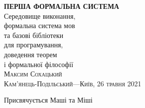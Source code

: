 \frontmatter
\thispagestyle{empty}
\mbox{}\vspace{1in}
\noindent
\begin{flushright}
\vspace{0.5cm}
\textbf{\Huge ПЕРША ФОРМАЛЬНА СИСТЕМА} \\
\vspace{0.5cm}
{\huge Середовище виконання, \\
        \huge формальна система мов \\
        \huge та базові бібліотеки \\
        \huge для програмування, \\
        \huge доведення теорем \\
        \huge і формальної філософії \\
}
\vspace{1em}
\vspace{6cm}
\hfill{\Large\scshape{}Максим Сохацький}
\\
\vspace{0.3cm}
\hfill{\scshape{}Кам'янець-Подільський---Київ, 26 травня 2021}
\end{flushright}
\cleartorecto
\tableofcontents*
\epigraph{Присвячується Маші та Міші}{}
\mainmatter
